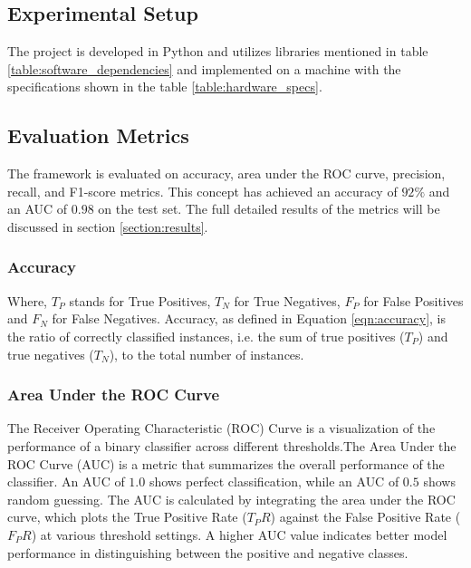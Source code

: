 
\subsection{Experimental Setup} \label{subsection:experimental_setup}

The project is developed in Python and utilizes libraries mentioned in table
\ref{table:software_dependencies} and implemented on a machine with the
specifications shown in the table \ref{table:hardware_specs}.




\subsection{Evaluation Metrics} \label{subsection:evaluation_metrics}

The framework is evaluated on accuracy, area under the ROC curve,
precision, recall, and F1-score metrics. This concept has achieved an
accuracy of $92\%$ and an AUC of $0.98$ on the test set. The full detailed
results of the metrics will be discussed in section \ref{section:results}.

\subsubsection{Accuracy}

Where, $T_P$ stands for True Positives, $T_N$ for True Negatives, $F_P$ for
False Positives and $F_N$ for False Negatives.
Accuracy, as defined in Equation \ref{eqn:accuracy}, is the ratio of correctly
classified instances, i.e. the sum of true positives ($T_P$) and true negatives
($T_N$), to the total number of instances.
\\
\subsubsection{Area Under the ROC Curve}
The Receiver Operating Characteristic (ROC) Curve is a visualization of the
performance of a binary classifier across different thresholds.The Area Under
the ROC Curve (AUC) is a metric that summarizes the overall performance of the
classifier. An AUC of $1.0$ shows perfect classification, while an AUC of $0.5$
shows random guessing. The AUC is calculated by integrating the area under the
ROC curve, which plots the True Positive Rate ($T_PR$) against the False
Positive Rate ($F_PR$) at various threshold settings. A higher AUC value
indicates better model performance in distinguishing between the positive and
negative classes. \\
